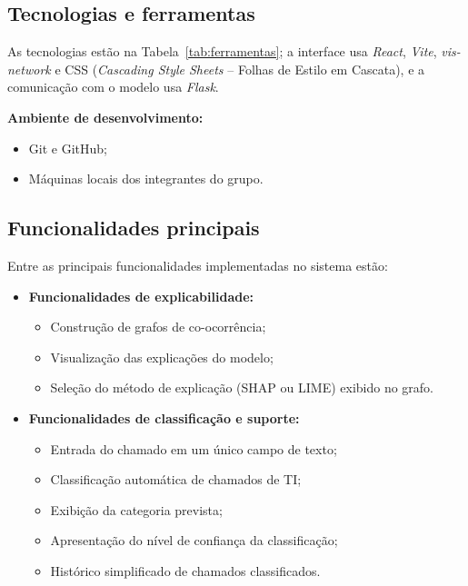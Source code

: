 \documentclass[
    12pt,                %
    openright,           %
    oneside,             %
    a4paper,             %
    english,             %
    brazil               %
]{abntex2}
\begin{document}
\subsection{Tecnologias e ferramentas}

As tecnologias estão na Tabela~\ref{tab:ferramentas}; a interface usa \textit{React}, \textit{Vite}, \textit{vis-network} e CSS (\textit{Cascading Style Sheets} -- Folhas de Estilo em Cascata), e a comunicação com o modelo usa \textit{Flask}.

\textbf{Ambiente de desenvolvimento:}

\begin{itemize}
    \item Git e GitHub;
    \item Máquinas locais dos integrantes do grupo.
\end{itemize}

\subsection{Funcionalidades principais}

Entre as principais funcionalidades implementadas no sistema estão:

\begin{itemize}
    \item \textbf{Funcionalidades de explicabilidade:}
    \begin{itemize}
        \item Construção de grafos de co-ocorrência;
        \item Visualização das explicações do modelo;
        \item Seleção do método de explicação (SHAP ou LIME) exibido no grafo.
    \end{itemize}
    \item \textbf{Funcionalidades de classificação e suporte:}
    \begin{itemize}
        \item Entrada do chamado em um único campo de texto;
        \item Classificação automática de chamados de TI;
        \item Exibição da categoria prevista;
        \item Apresentação do nível de confiança da classificação;
        \item Histórico simplificado de chamados classificados.
    \end{itemize}
\end{itemize}
\end{document}
